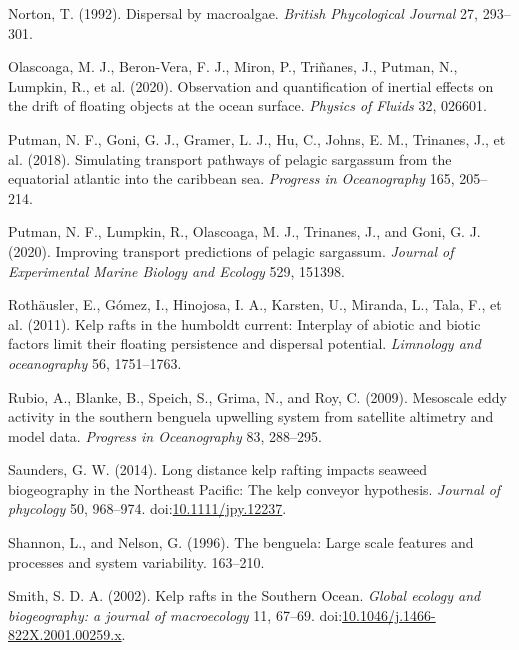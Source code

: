 \documentclass[
]{article}
\begin{document}
\leavevmode\hypertarget{ref-norton1992}{}%
Norton, T. (1992). Dispersal by macroalgae. \emph{British Phycological
Journal} 27, 293--301.

\leavevmode\hypertarget{ref-olascoaga2020}{}%
Olascoaga, M. J., Beron-Vera, F. J., Miron, P., Triñanes, J., Putman,
N., Lumpkin, R., et al. (2020). Observation and quantification of
inertial effects on the drift of floating objects at the ocean surface.
\emph{Physics of Fluids} 32, 026601.

\leavevmode\hypertarget{ref-putman2018}{}%
Putman, N. F., Goni, G. J., Gramer, L. J., Hu, C., Johns, E. M.,
Trinanes, J., et al. (2018). Simulating transport pathways of pelagic
sargassum from the equatorial atlantic into the caribbean sea.
\emph{Progress in Oceanography} 165, 205--214.

\leavevmode\hypertarget{ref-putman2020}{}%
Putman, N. F., Lumpkin, R., Olascoaga, M. J., Trinanes, J., and Goni, G.
J. (2020). Improving transport predictions of pelagic sargassum.
\emph{Journal of Experimental Marine Biology and Ecology} 529, 151398.

\leavevmode\hypertarget{ref-rothausler2011}{}%
Rothäusler, E., Gómez, I., Hinojosa, I. A., Karsten, U., Miranda, L.,
Tala, F., et al. (2011). Kelp rafts in the humboldt current: Interplay
of abiotic and biotic factors limit their floating persistence and
dispersal potential. \emph{Limnology and oceanography} 56, 1751--1763.

\leavevmode\hypertarget{ref-rubio2009}{}%
Rubio, A., Blanke, B., Speich, S., Grima, N., and Roy, C. (2009).
Mesoscale eddy activity in the southern benguela upwelling system from
satellite altimetry and model data. \emph{Progress in Oceanography} 83,
288--295.

\leavevmode\hypertarget{ref-saunders2014}{}%
Saunders, G. W. (2014). Long distance kelp rafting impacts seaweed
biogeography in the Northeast Pacific: The kelp conveyor hypothesis.
\emph{Journal of phycology} 50, 968--974.
doi:\href{https://doi.org/10.1111/jpy.12237}{10.1111/jpy.12237}.

\leavevmode\hypertarget{ref-shannon1996}{}%
Shannon, L., and Nelson, G. (1996). The benguela: Large scale features
and processes and system variability. 163--210.

\leavevmode\hypertarget{ref-smith2002}{}%
Smith, S. D. A. (2002). Kelp rafts in the Southern Ocean. \emph{Global
ecology and biogeography: a journal of macroecology} 11, 67--69.
doi:\href{https://doi.org/10.1046/j.1466-822X.2001.00259.x}{10.1046/j.1466-822X.2001.00259.x}.
\end{document}
